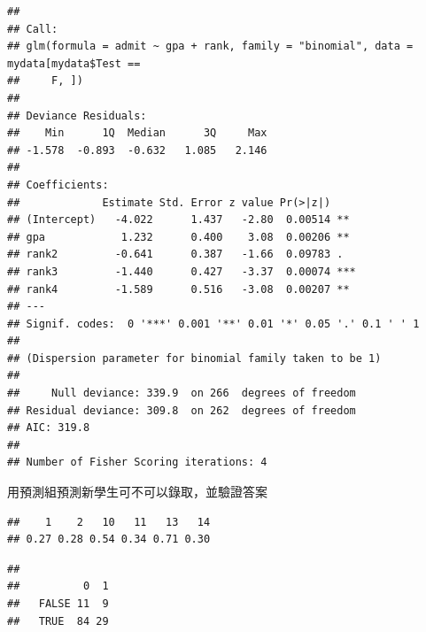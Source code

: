 \documentclass[
]{book}
\newenvironment{Shaded}{\begin{snugshade}}{\end{snugshade}}
\newcommand{\CommentTok}[1]{\textcolor[rgb]{0.56,0.35,0.01}{\textit{#1}}}
\newcommand{\DataTypeTok}[1]{\textcolor[rgb]{0.13,0.29,0.53}{#1}}
\newcommand{\FloatTok}[1]{\textcolor[rgb]{0.00,0.00,0.81}{#1}}
\newcommand{\KeywordTok}[1]{\textcolor[rgb]{0.13,0.29,0.53}{\textbf{#1}}}
\newcommand{\NormalTok}[1]{#1}
\newcommand{\OperatorTok}[1]{\textcolor[rgb]{0.81,0.36,0.00}{\textbf{#1}}}
\newcommand{\StringTok}[1]{\textcolor[rgb]{0.31,0.60,0.02}{#1}}
\begin{document}
\begin{verbatim}
## 
## Call:
## glm(formula = admit ~ gpa + rank, family = "binomial", data = mydata[mydata$Test == 
##     F, ])
## 
## Deviance Residuals: 
##    Min      1Q  Median      3Q     Max  
## -1.578  -0.893  -0.632   1.085   2.146  
## 
## Coefficients:
##             Estimate Std. Error z value Pr(>|z|)    
## (Intercept)   -4.022      1.437   -2.80  0.00514 ** 
## gpa            1.232      0.400    3.08  0.00206 ** 
## rank2         -0.641      0.387   -1.66  0.09783 .  
## rank3         -1.440      0.427   -3.37  0.00074 ***
## rank4         -1.589      0.516   -3.08  0.00207 ** 
## ---
## Signif. codes:  0 '***' 0.001 '**' 0.01 '*' 0.05 '.' 0.1 ' ' 1
## 
## (Dispersion parameter for binomial family taken to be 1)
## 
##     Null deviance: 339.9  on 266  degrees of freedom
## Residual deviance: 309.8  on 262  degrees of freedom
## AIC: 319.8
## 
## Number of Fisher Scoring iterations: 4
\end{verbatim}

用預測組預測新學生可不可以錄取，並驗證答案

\begin{Shaded}
\end{Shaded}

\begin{verbatim}
##    1    2   10   11   13   14 
## 0.27 0.28 0.54 0.34 0.71 0.30
\end{verbatim}

\begin{Shaded}
\end{Shaded}

\begin{verbatim}
##        
##          0  1
##   FALSE 11  9
##   TRUE  84 29
\end{verbatim}
\end{document}
